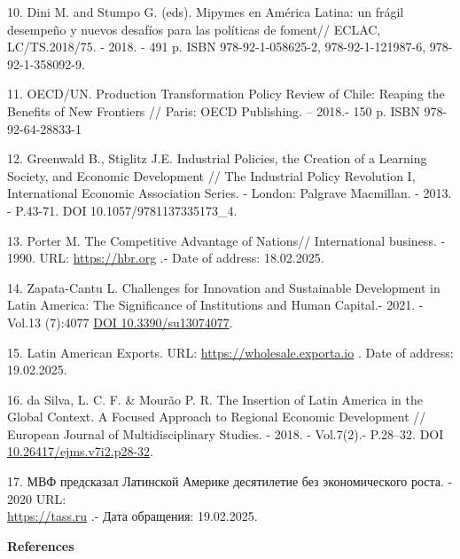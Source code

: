 \begin{references}
10. Dini M. and Stumpo G. (eds). Mipymes en América Latina: un frágil
desempeño y nuevos desafíos para las políticas de foment// ECLAC,
LC/TS.2018/75. - 2018. - 491 p. ISBN 978-92-1-058625-2,
978-92-1-121987-6, 978-92-1-358092-9.

11. OECD/UN. Production Transformation Policy Review of Chile: Reaping
the Benefits of New Frontiers // Paris: OECD Publishing. -- 2018.- 150
p. ISBN 978-92-64-28833-1

12. Greenwald B., Stiglitz J.E. Industrial Policies, the Creation of a
Learning Society, and Economic Development // The Industrial Policy
Revolution I, International Economic Association Series. - London:
Palgrave Macmillan. - 2013. - P.43-71. DOI 10.1057/9781137335173\_4.

13. Porter M. The Competitive Advantage of Nations// International
business. - 1990. URL:
\href{https://hbr.org/1990/03/the-competitive-advantage-of-nations}{https://hbr.org} .-
Date of address: 18.02.2025.

14. Zapata-Cantu L. Challenges for Innovation and Sustainable Development
in Latin America: The Signi\-ficance of Institutions and Human Capital.-
2021. -Vol.13 (7):4077
\href{https://doi.org/10.3390/su13074077}{DOI 10.3390/su13074077}.

15. Latin American Exports. URL:
\href{https://wholesale.exporta.io/blog/latin-american-exports}{https://wholesale.exporta.io} . Date of
address: 19.02.2025.

16. da Silva, L. C. F. \& Mourão P. R. The Insertion of Latin America in
the Global Context. A Focused Approach to Regional Economic Development
// European Journal of Multidisciplinary Studies. - 2018. - Vol.7(2).-
P.28--32. DOI
\href{http://dx.doi.org/10.26417/ejms.v7i2.p28-32}{10.26417/ejms.v7i2.p28-32}.

17. МВФ предсказал Латинской Америке десятилетие без экономического
роста. - 2020 URL: \\\href{https://tass.ru/ekonomika/8266077}{https://tass.ru} .- Дата
обращения: 19.02.2025.
\end{references}

\begin{center}
{\bfseries References}
\end{center}

